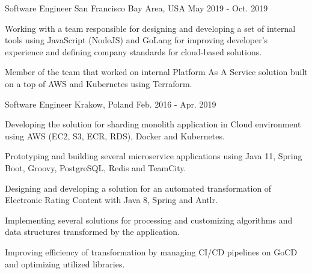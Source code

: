 \begin{cventries}
  \cventry
    {Software Engineer} %
    {} %
    {San Francisco Bay Area, USA} %
    {May 2019 - Oct. 2019} %
    {
      \begin{cvitems} %
        \item {Working with a team responsible for designing and developing a set of internal tools using JavaScript (NodeJS) and GoLang for improving developer's experience and defining company standards for cloud-based solutions.}
        \item {Member of the team that worked on internal Platform As A Service solution built on a top of AWS and Kubernetes using Terraform. }
      \end{cvitems}
    }

  \cventry
    {Software Engineer} %
    { } %
    {Krakow, Poland} %
    {Feb. 2016 - Apr. 2019} %
    {
      \begin{cvitems} %
        \item {Developing the solution for sharding monolith application in Cloud environment using AWS (EC2, S3, ECR, RDS), Docker and Kubernetes.}
        \item {Prototyping and building several microservice applications using Java 11, Spring Boot, Groovy, PostgreSQL, Redis and TeamCity.}
        \item {Designing and developing a solution for an automated transformation of Electronic Rating Content with Java 8, Spring and Antlr.}
        \item {Implementing several solutions for processing and customizing algorithms and data structures transformed by the application.}
        \item {Improving efficiency of transformation by managing CI/CD pipelines on GoCD and optimizing utilized libraries.}
      \end{cvitems}
    }


\end{cventries}
